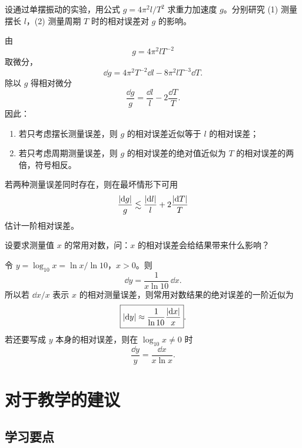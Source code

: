 \begin{xexercise}[4]
设通过单摆振动的实验，用公式 $g=4\pi^2l/T^2$ 求重力加速度 $g$。分别研究 (1) 测量摆长 $l$，(2) 测量周期 $T$ 时的相对误差对 $g$ 的影响。
\end{xexercise}
\begin{xsolution}
由
\[
  g=4\pi^2lT^{-2}
\]
取微分，
\[
  \dd g=4\pi^2T^{-2}\dd l-8\pi^2lT^{-3}\dd T.
\]
除以 $g$ 得相对微分
\[
  \boxed{\frac{\dd g}{g}=\frac{\dd l}{l}-2\frac{\dd T}{T}}.
\]
因此：
\begin{enumerate}[label=(\arabic*)]
  \item 若只考虑摆长测量误差，则 $g$ 的相对误差近似等于 $l$ 的相对误差；
  \item 若只考虑周期测量误差，则 $g$ 的相对误差的绝对值近似为 $T$ 的相对误差的两倍，符号相反。
\end{enumerate}
若两种测量误差同时存在，则在最坏情形下可用
\[
  \frac{\lvert\mathop{}\!\mathrm{d} g\rvert}g\lesssim \frac{\lvert\mathop{}\!\mathrm{d} l\rvert}l+2\frac{\lvert\mathop{}\!\mathrm{d} T\rvert}T
\]
估计一阶相对误差。
\end{xsolution}


\begin{xexercise}[5]
设要求测量值 $x$ 的常用对数，问：$x$ 的相对误差会给结果带来什么影响？
\end{xexercise}
\begin{xsolution}
令 $y=\log_{10}x=\ln x/\ln10$，$x>0$。则
\[
  \dd y=\frac1{x\ln10}\,\dd x.
\]
所以若 $\dd x/x$ 表示 $x$ 的相对测量误差，则常用对数结果的绝对误差的一阶近似为
\[
  \boxed{\lvert\mathop{}\!\mathrm{d} y\rvert\approx\frac1{\ln10}\frac{\lvert\mathop{}\!\mathrm{d} x\rvert}x}.
\]
若还要写成 $y$ 本身的相对误差，则在 $\log_{10}x\ne0$ 时
\[
  \boxed{\frac{\dd y}{y}=\frac{\dd x}{x\ln x}}.
\]
\end{xsolution}



\section{对于教学的建议}

\subsection{学习要点}

